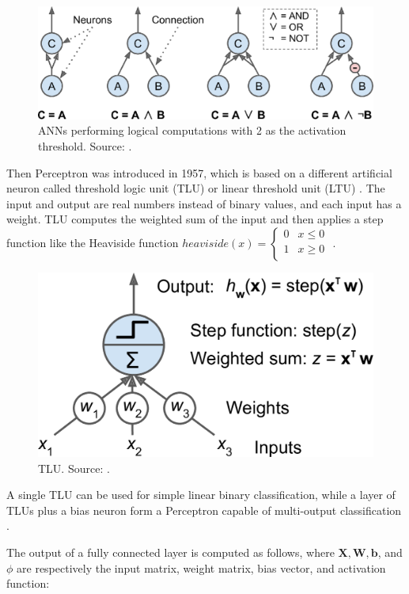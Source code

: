 \documentclass[a4paper, 11pt, oneside]{article}
\begin{document}
\begin{figure}[ht]
  \begin{center}
    \includegraphics[width=.5\textwidth]{ann_logic_computations.png}
  \end{center}
  \caption{ANNs performing logical computations with 2 as the activation threshold. Source: \cite{geron2019hands}.}
\end{figure}

Then Perceptron was introduced in 1957, which is based on a different artificial neuron called threshold logic unit
(TLU) or linear threshold unit (LTU) \cite{rosenblatt1957perceptron}. The input and output are real numbers instead of
binary values, and each input has a weight. TLU computes the weighted sum of the input and then applies a step
function like the Heaviside function
$heaviside (x) =
\begin{cases}
  0 & x \le 0 \\
  1 & x \geq 0 \\
\end{cases}$
\cite{geron2019hands, rosenblatt1957perceptron}.

\begin{figure}[ht]
  \begin{center}
    \includegraphics[width=.5\textwidth]{tlu.png}
  \end{center}
  \caption{TLU. Source: \cite{geron2019hands}.}
\end{figure}

A single TLU can be used for simple linear binary classification, while a layer of TLUs plus a bias neuron form a
Perceptron capable of multi-output classification \cite{geron2019hands}.

The output of a fully connected layer is computed as follows, where $\mathbf{X}, \mathbf{W}, \mathbf{b}$, and $\phi$
are respectively the input matrix, weight matrix, bias vector, and activation function:
\end{document}
